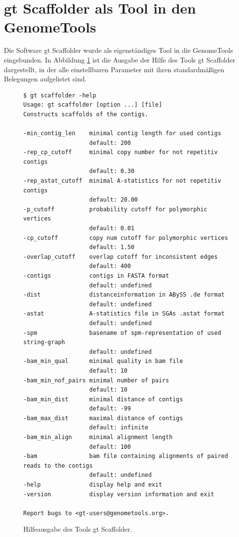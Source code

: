 \documentclass[a4paper,10pt,parskip]{scrartcl}
\begin{document}
\section{gt Scaffolder als Tool in den GenomeTools}
Die Software gt Scaffolder wurde als eigenständiges Tool in die GenomeTools
eingebunden. In Abbildung \ref{abb: help} ist die Ausgabe der Hilfe des Tools
gt Scaffolder dargestellt, in der alle einstellbaren Parameter mit ihren
standardmäßigen Belegungen aufgelistet sind.

\begin{figure}
\begin{verbatim}
$ gt scaffolder -help
Usage: gt scaffolder [option ...] [file]
Constructs scaffolds of the contigs.

-min_contig_len    minimal contig length for used contigs
                   default: 200
-rep_cp_cutoff     minimal copy number for not repetitiv contigs
                   default: 0.30
-rep_astat_cutoff  minimal A-statistics for not repetitiv contigs
                   default: 20.00
-p_cutoff          probability cutoff for polymorphic vertices
                   default: 0.01
-cp_cutoff         copy num cutoff for polymorphic vertices
                   default: 1.50
-overlap_cutoff    overlap cutoff for inconsistent edges
                   default: 400
-contigs           contigs in FASTA format
                   default: undefined
-dist              distanceinformation in ABySS .de format
                   default: undefined
-astat             A-statistics file in SGAs .astat format
                   default: undefined
-spm               basename of spm-representation of used string-graph
                   default: undefined
-bam_min_qual      minimal quality in bam file
                   default: 10
-bam_min_nof_pairs minimal number of pairs
                   default: 10
-bam_min_dist      minimal distance of contigs
                   default: -99
-bam_max_dist      maximal distance of contigs
                   default: infinite
-bam_min_align     minimal alignment length
                   default: 100
-bam               bam file containing alignments of paired reads to the contigs
                   default: undefined
-help              display help and exit
-version           display version information and exit

Report bugs to <gt-users@genometools.org>.
\end{verbatim}
\caption{\label{abb: help}Hilfeausgabe des Tools gt Scaffolder.}
\end{figure}
\end{document}
